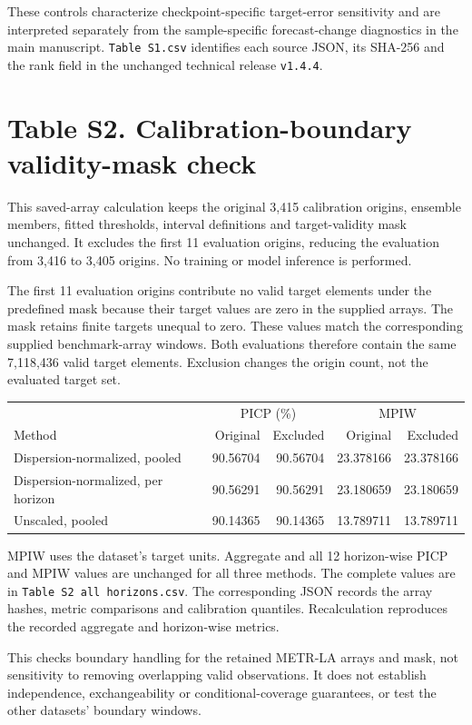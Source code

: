 \documentclass[10pt,a4paper]{article}
\begin{document}
These controls characterize checkpoint-specific target-error sensitivity and are
interpreted separately from the sample-specific forecast-change diagnostics in
the main manuscript.
\texttt{Table S1.csv} identifies each source JSON, its SHA-256 and the rank field
in the unchanged technical release \texttt{v1.4.4}.

\clearpage
\section*{Table S2. Calibration-boundary validity-mask check}
This saved-array calculation keeps the original 3,415 calibration origins,
ensemble members, fitted thresholds, interval definitions and target-validity
mask unchanged. It excludes the first 11 evaluation origins, reducing the
evaluation from 3,416 to 3,405 origins. No training or model inference is performed.

The first 11 evaluation origins contribute no valid target elements under the
predefined mask because their target values are zero in the supplied arrays.
The mask retains finite targets unequal to zero. These values match the
corresponding supplied benchmark-array windows. Both evaluations therefore
contain the same 7,118,436 valid target elements. Exclusion changes the origin
count, not the evaluated target set.

\begin{center}\small
\begin{tabular}{lrrrr}
\toprule
 & \multicolumn{2}{c}{PICP (\%)} & \multicolumn{2}{c}{MPIW}\\
Method & Original & Excluded & Original & Excluded\\
\midrule
Dispersion-normalized, pooled & 90.56704 & 90.56704 & 23.378166 & 23.378166 \\
Dispersion-normalized, per horizon & 90.56291 & 90.56291 & 23.180659 & 23.180659 \\
Unscaled, pooled & 90.14365 & 90.14365 & 13.789711 & 13.789711 \\
\bottomrule
\end{tabular}
\end{center}
MPIW uses the dataset's target units. Aggregate and all 12 horizon-wise PICP and
MPIW values are unchanged for all three methods. The complete values are in
\texttt{Table S2 all horizons.csv}. The corresponding JSON records the array
hashes, metric comparisons and calibration quantiles. Recalculation reproduces
the recorded aggregate and horizon-wise metrics.

This checks boundary handling for the retained METR-LA arrays and mask, not
sensitivity to removing overlapping valid observations. It does not establish
independence, exchangeability or conditional-coverage guarantees, or test the
other datasets' boundary windows.
\end{document}
